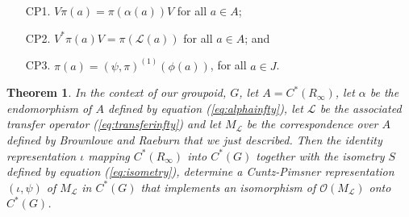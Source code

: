 \documentclass{amsproc}
\theoremstyle{plain}
\newtheorem{thm}{Theorem}[section]
\theoremstyle{definition}
\theoremstyle{definition}
\theoremstyle{remark}
\theoremstyle{plain}
\begin{document}
\begin{enumerate}
\item [CP1.]$V\pi(a)=\pi(\alpha(a))V$ for all $a\in A$; 
\item [CP2.]$V^{*}\pi(a)V=\pi(\mathcal{L}(a))$ for all $a\in A$; and
\item [CP3.]$\pi(a)=(\psi,\pi)^{(1)}(\phi(a))$, for all $a\in J$.
\end{enumerate}
\begin{thm}
\label{thm:ExelCP}In the context of our groupoid, $G$, let
$A=C^{*}(R_{\infty})$,
let $\alpha$ be the endomorphism of $A$ defined by equation
(\ref{eq:alphainfty}),
let $\mathcal{L}$ be the associated transfer operator (\ref{eq:transferinfty})
and let $M_{\mathcal{L}}$ be the correspondence over $A$ defined
by Brownlowe and Raeburn that we just described. Then the identity
representation $\iota$ mapping $C^{*}(R_{\infty})$ into $C^{*}(G)$
together with the isometry $S$ defined by equation (\ref{eq:isometry}),
determine a Cuntz-Pimsner representation $(\iota,\psi)$ of $M_{\mathcal{L}}$
in $C^{*}(G)$ that implements an isomorphism of $\mathcal{O}(M_{\mathcal{L}})$
onto $C^{*}(G)$.
\end{thm}
\end{document}
